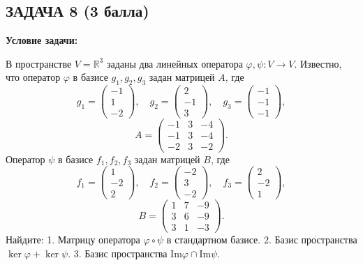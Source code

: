 \documentclass[a4paper,12pt]{article}
\begin{document}
\vspace{1cm}

\subsection{ЗАДАЧА 8 \hfill \textbf{(3 балла)}}
\textbf{Условие задачи:}

В пространстве \( V = \mathbb{R}^3 \) заданы два линейных оператора \( \varphi, \psi: V \to V \). Известно, что оператор \( \varphi \) в базисе \( g_1, g_2, g_3 \) задан матрицей \( A \), где
\[
g_1 =
\begin{pmatrix}
-1 \\
1 \\
-2
\end{pmatrix},
\quad
g_2 =
\begin{pmatrix}
2 \\
-1 \\
3
\end{pmatrix},
\quad
g_3 =
\begin{pmatrix}
-1 \\
-1 \\
-1
\end{pmatrix},
\]
\[
A =
\begin{pmatrix}
-1 & 3 & -4 \\
-1 & 3 & -4 \\
-2 & 3 & -2
\end{pmatrix}.
\]
Оператор \( \psi \) в базисе \( f_1, f_2, f_3 \) задан матрицей \( B \), где
\[
f_1 =
\begin{pmatrix}
1 \\
-2 \\
2
\end{pmatrix},
\quad
f_2 =
\begin{pmatrix}
-2 \\
3 \\
-2
\end{pmatrix},
\quad
f_3 =
\begin{pmatrix}
2 \\
-2 \\
1
\end{pmatrix},
\]
\[
B =
\begin{pmatrix}
1 & 7 & -9 \\
3 & 6 & -9 \\
3 & 1 & -3
\end{pmatrix}.
\]
Найдите:
1. Матрицу оператора \( \varphi \circ \psi \) в стандартном базисе.
2. Базис пространства \( \ker \varphi + \ker \psi \).
3. Базис пространства \( \text{Im} \varphi \cap \text{Im} \psi \).
\end{document}

